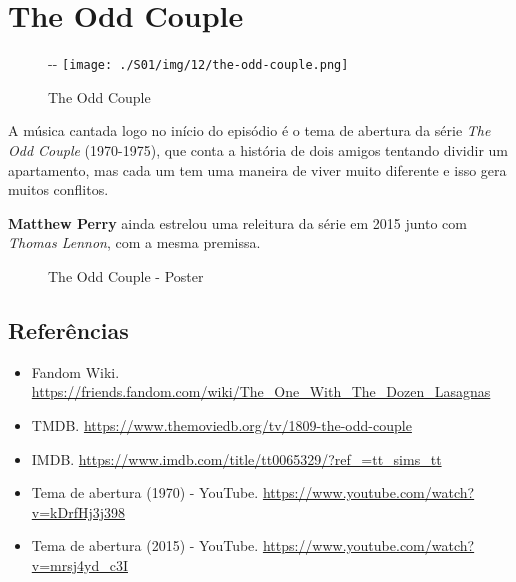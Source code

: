 \hypertarget{the-odd-couple}{%
\section{The Odd Couple}\label{the-odd-couple}}

\begin{figure}[!ht]
  \begin{adjustwidth}{-\oddsidemargin-1in}{-\rightmargin}
    \centering
    \texttt{[image: ./S01/img/12/the-odd-couple.png]}
    \caption{The Odd Couple\label{fig:the-odd-couple}}
  \end{adjustwidth}
\end{figure}

A música cantada logo no início do episódio é o tema de abertura da
série \emph{The Odd Couple} (1970-1975), que conta a história de dois
amigos tentando dividir um apartamento, mas cada um tem uma maneira de
viver muito diferente e isso gera muitos conflitos.

\textbf{Matthew Perry} ainda estrelou uma releitura da série em 2015
junto com \emph{Thomas Lennon}, com a mesma premissa.

\begin{figure}
  \centering
    \caption{The Odd Couple - Poster\label{fig:the-odd-couple-poster}}
\end{figure}

\hypertarget{referuxeancias}{%
\subsection{Referências}\label{referuxeancias}}

\begin{itemize}
\tightlist
\item
  \sloppy Fandom Wiki. \url{https://friends.fandom.com/wiki/The_One_With_The_Dozen_Lasagnas}
\item
  \sloppy TMDB. \url{https://www.themoviedb.org/tv/1809-the-odd-couple}
\item
  \sloppy IMDB. \url{https://www.imdb.com/title/tt0065329/?ref_=tt_sims_tt}
\item
  \sloppy Tema de abertura (1970) - YouTube. \url{https://www.youtube.com/watch?v=kDrfHj3j398}
\item
  \sloppy Tema de abertura (2015) - YouTube. \url{https://www.youtube.com/watch?v=mrsj4yd_c3I}
\end{itemize}

